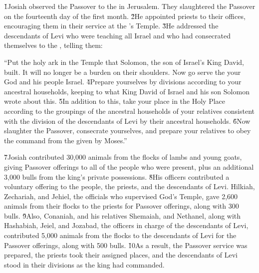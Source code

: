 \v{1}Josiah observed the Passover to the  in Jerusalem. They slaughtered the Passover on the fourteenth day of the first month. \v{2}He appointed priests to their offices, encouraging them in their service at the 's Temple. \v{3}He addressed the descendants of Levi who were teaching all Israel and who had consecrated themselves to the , telling them:

\begin{poetry}
\poeml ``Put the holy ark in the Temple that Solomon, the son of Israel's King David, built. It will no longer be a burden on their shoulders. Now go serve the  your God and his people Israel. \v{4}Prepare yourselves by divisions according to your ancestral households, keeping to what King David of Israel and his son Solomon wrote about this. \v{5}In addition to this, take your place in the Holy Place according to the groupings of the ancestral households of your relatives consistent with the division of the descendants of Levi by their ancestral households. \v{6}Now slaughter the Passover, consecrate yourselves, and prepare your relatives to obey the command from the  given by Moses.''
\end{poetry}

\v{7}Josiah contributed 30,000 animals from the flocks of lambs and young goats, giving Passover offerings to all of the people who were present, plus an additional 3,000 bulls from the king's private possessions. \v{8}His officers contributed a voluntary offering to the people, the priests, and the descendants of Levi. Hilkiah, Zechariah, and Jehiel, the officials who supervised God's Temple, gave 2,600 animals from their flocks to the priests for Passover offerings, along with 300 bulls. \v{9}Also, Conaniah, and his relatives Shemaiah, and Nethanel, along with Hashabiah, Jeiel, and Jozabad, the officers in charge of the descendants of Levi, contributed 5,000 animals from the flocks to the descendants of Levi for the Passover offerings, along with 500 bulls. \v{10}As a result, the Passover service was prepared, the priests took their assigned places, and the descendants of Levi stood in their divisions as the king had commanded.

